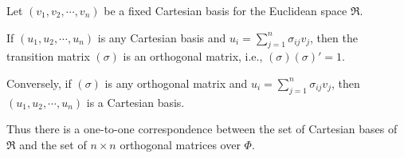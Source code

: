 Let $(v_1, v_2, \cdots, v_n)$ be a fixed Cartesian basis for the Euclidean space $\Re$.

If $(u_1, u_2, \cdots, u_n)$ is any Cartesian basis and $u_i = \sum_{j=1}^n \sigma_{ij} v_j$, then the transition matrix $(\sigma)$ is an orthogonal matrix, i.e., $(\sigma)(\sigma)' = 1$.

Conversely, if $(\sigma)$ is any orthogonal matrix and $u_i = \sum_{j=1}^n \sigma_{ij} v_j$, then $(u_1, u_2, \cdots, u_n)$ is a Cartesian basis.

Thus there is a one-to-one correspondence between the set of Cartesian bases of $\Re$ and the set of $n \times n$ orthogonal matrices over $\Phi$.
